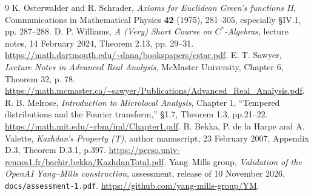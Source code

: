 \documentclass[11pt]{article}
\theoremstyle{remark}
\begin{document}




\begin{thebibliography}{9}
 K. Osterwalder and R. Schrader,
\emph{Axioms for Euclidean Green's functions II},
Communications in Mathematical Physics \textbf{42} (1975), 281--305,
especially \S IV.1, pp. 287--288.
 D. P. Williams,
\emph{A (Very) Short Course on $C^*$-Algebras},
lecture notes, 14 February 2024, Theorem 2.13, pp. 29--31.
\url{https://math.dartmouth.edu/~dana/bookspapers/cstar.pdf}.
 E. T. Sawyer,
\emph{Lecture Notes in Advanced Real Analysis},
McMaster University, Chapter 6, Theorem 32, p. 78.
\url{https://math.mcmaster.ca/~sawyer/Publications/Advanced_Real_Analysis.pdf}.
 R. B. Melrose,
\emph{Introduction to Microlocal Analysis}, Chapter 1,
``Tempered distributions and the Fourier transform,''
\S1.7, Theorem 1.3, pp.21--22.
\url{https://math.mit.edu/~rbm/iml/Chapter1.pdf}.
 B. Bekka, P. de la Harpe and A. Valette,
\emph{Kazhdan's Property (T)}, author manuscript, 23 February 2007,
Appendix D.3, Theorem D.3.1, p.397.
\url{https://perso.univ-rennes1.fr/bachir.bekka/KazhdanTotal.pdf}.
 Yang--Mills group,
\emph{Validation of the OpenAI Yang--Mills construction},
assessment, release of 10 November 2026, \texttt{docs/assessment-1.pdf}.
\url{https://github.com/yang-mills-group/YM}.
\end{thebibliography}
\end{document}
